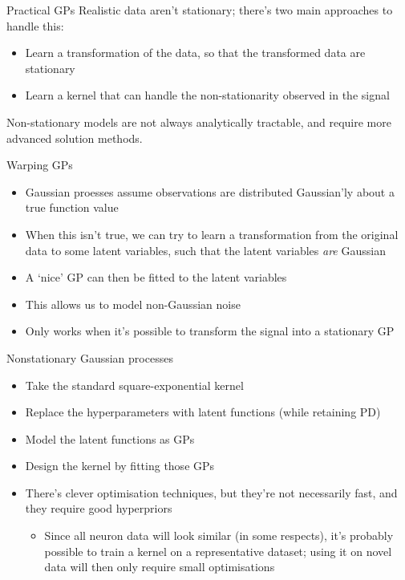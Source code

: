 \documentclass[presentation]{beamer}
\begin{document}
\begin{frame}[label={sec:org3bc0707}]{Practical GPs}
Realistic data aren't stationary; there's two main approaches to handle this:

\vfill

\begin{itemize}
\item Learn a transformation of the data, so that the transformed data are stationary
\item Learn a kernel that can handle the non-stationarity observed in the signal
\end{itemize}

\vfill

Non-stationary models are not always analytically tractable, and require more advanced solution methods.
\end{frame}

\begin{frame}[label={sec:org8ef5ee7}]{Warping GPs}
\begin{itemize}
\item Gaussian proesses assume observations are distributed Gaussian'ly about a true function value
\item When this isn't true, we can try to learn a transformation from the original data to some latent variables, such that the latent variables \emph{are} Gaussian
\item A `nice' GP can then be fitted to the latent variables
\item This allows us to model non-Gaussian noise
\item Only works when it's possible to transform the signal into a stationary GP
\end{itemize}
\end{frame}

\begin{frame}[label={sec:org04dfb42}]{Nonstationary Gaussian processes}
\begin{itemize}
\item Take the standard square-exponential kernel
\item Replace the hyperparameters with latent functions (while retaining PD)
\item Model the latent functions as GPs
\item Design the kernel by fitting those GPs
\item There's clever optimisation techniques, \alert{but they're not necessarily fast, and they require good hyperpriors}
\begin{itemize}
\item Since all neuron data will look similar (in some respects), it's probably possible to train a kernel on a representative dataset; using it on novel data will then only require small optimisations
\end{itemize}
\end{itemize}
\end{frame}
\end{document}
